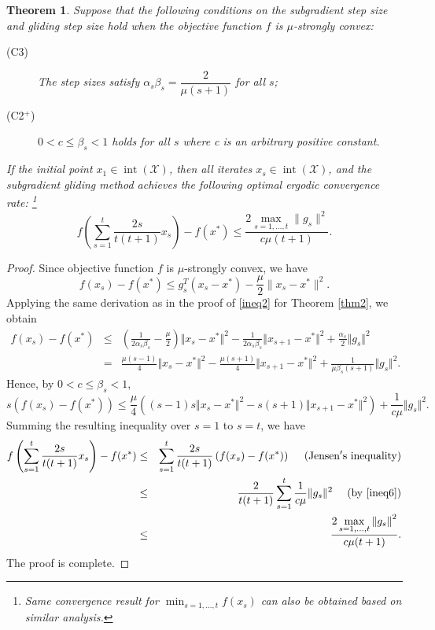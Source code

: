 \documentclass[sn-mathphys]{JORSC-jnl}%
\theoremstyle{thmstyleone}%
\newtheorem{theorem}{Theorem}[section]%
\theoremstyle{thmstylethree}%
\begin{document}
\begin{theorem}\label{thm4} 
	Suppose that the following conditions on the subgradient step size and gliding step size hold when the objective function $f$ is $\mu$-strongly convex:
	\begin{description}
		\item[(C3)] The step sizes satisfy $\alpha_s \beta_s = \dfrac{2}{\mu (s+1)}$ for all $s$;
		\item[(C2$^+$)] $0 < c \leq \beta_s <1$ holds for all $s$ where c is an arbitrary positive constant.
	\end{description}
	If the initial point $x_1 \in \operatorname{int}(\mathcal{X})$, then all iterates $x_s \in \operatorname{int}(\mathcal{X})$, and the subgradient gliding method achieves the following optimal ergodic convergence rate: \footnote{Same convergence result for $\min_{s=1,\ldots,t} f(x_s)$ can also be obtained based on similar analysis.}
	\begin{equation}\label{conver2}
		f\left(\sum_{s=1}^t \frac{2s}{t(t+1)} x_s\right) - f(x^*)
		\le
		\frac{2 \max\limits_{s=1,\dots,t} \|g_s\|^2}{c \mu (t+1)}.
	\end{equation}
\end{theorem}


\begin{proof}
	Since objective function $f$ is $\mu$-strongly convex, we have
	\begin{equation*}
		f(x_s)-f(x^*)\leq g_s^T(x_s-x^*) - \frac{\mu}{2}\|x_s-x^*\|^2. 
	\end{equation*}
	Applying the same derivation as in the proof of \eqref{ineq2} for Theorem \ref{thm2}, we obtain
	\begin{eqnarray}
		f(x_s)-f(x^*)&\leq& \left(\frac{1}{2\alpha_s\beta_s}-\frac{\mu}{2}\right)\Vert x_s-x^* \Vert^2-\frac{1}{2\alpha_s\beta_s}\Vert x_{s+1}-x^* \Vert^2+\frac{\alpha_s}{2}\Vert g_s \Vert^2 \nonumber \\
		&=& \frac{\mu(s-1)}{4}\Vert x_s-x^* \Vert^2-\frac{\mu(s+1)}{4}\Vert x_{s+1}-x^* \Vert^2 + \frac{1}{\mu\beta_s(s+1)}\Vert g_s \Vert^2. \nonumber
	\end{eqnarray}
	Hence, by $0 < c \leq \beta_s <1$,
	\begin{equation}\label{ineq6}
		s\left(f(x_s)-f(x^*)\right)\leq \frac{\mu}{4}\left((s-1)s\Vert x_s-x^* \Vert^2 - s(s+1)\Vert x_{s+1}-x^* \Vert^2\right) + \frac{1}{c\mu}\Vert g_s \Vert^2. 
	\end{equation}
	Summing the resulting inequality over $s=1$ to $s=t$, we have
	\begin{eqnarray}
		f\left(\sum_{s=1}^t\frac{2s}{t(t+1)}x_s\right)-f(x^*)&\leq& \sum_{s=1}^{t} \frac{2s}{t(t+1)}\left(f(x_s)-f(x^*)\right) ~~~~({\rm Jensen's~ inequality})\nonumber \\
		&\leq&  \frac{2}{t(t+1)}\sum_{s=1}^t \frac{1}{c\mu}\Vert g_s \Vert^2~~~~({\rm by~ \eqref{ineq6}})\nonumber\\
		&\leq& \frac{2\max\limits_{s=1,\dots,t}{\|g_s\|}^2}{c\mu(t+1)}.\nonumber
	\end{eqnarray}
	The proof is complete.
\end{proof}
\end{document}
